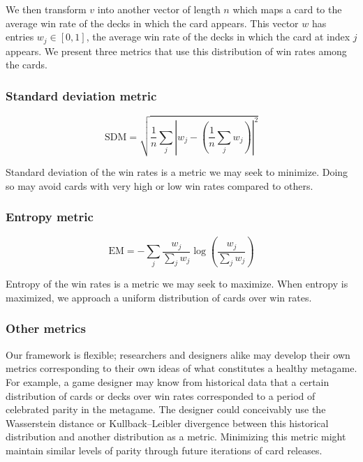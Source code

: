 We then transform $v$ into another vector of length $n$ which maps a card to the
average win rate of the decks in which the card appears. This
vector $w$ has entries
$w_j \in [0, 1]$, the average win rate of the decks in which
the card at index $j$ appears. We present three metrics that 
use this distribution of win rates among the cards.




\subsubsection{Standard deviation metric}

\begin{equation}
	\mathrm{SDM} = \sqrt{\frac{1}{n} \sum_j \left|w_j - \left(\frac{1}{n}\sum_j w_j\right)\right|^2}
\end{equation}

Standard deviation of the win rates is a metric we may seek to minimize. Doing so may avoid cards with
very high or low win rates compared to others.

\subsubsection{Entropy metric}

\begin{equation}
	\mathrm{EM} = -\sum_j \frac{w_j}{\sum_j w_j} \log\left(\frac{w_j}{\sum_j w_j}\right)
\end{equation}

Entropy of the win rates is a metric we may seek to maximize. When entropy is maximized, we approach a uniform
distribution of cards over win rates.

\subsubsection{Other metrics}

Our framework is flexible; researchers and designers alike may develop their own metrics corresponding to their
own ideas of what constitutes a healthy metagame. For example, a game designer may know from historical data that
a certain distribution of cards or decks over win rates corresponded to a period of celebrated parity in the metagame. 
The designer could conceivably use the Wasserstein distance or Kullback--Leibler 
divergence between this historical distribution and another distribution as a metric. Minimizing this metric 
might maintain similar levels of parity through future iterations of card releases.

